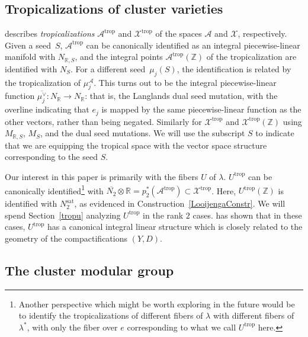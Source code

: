 \documentclass[10pt,a4paper]{amsart}
\numberwithin{equation}{section}
\numberwithin{figure}{section}
\numberwithin{table}{section}
\DeclareMathOperator{\trop}{trop}
\DeclareMathOperator{\sat}{sat}
\let\?=\overline
\let\bb=\mathbb
\let\rar=\rightarrow
\let\s=\mathcal
\theoremstyle{definition}
\begin{document}
\subsection{Tropicalizations of cluster varieties}\label{ClusterTrop}
\cite{FG1} describes {\it tropicalizations} $\s{A}^{\trop}$ and $\s{X}^{\trop}$ of the spaces $\s{A}$ and $\s{X}$, respectively. Given a seed~$S$, $\s{A}^{\trop}$ can be canonically identified as an integral piecewise-linear manifold with $N_{\bb{R},S}$, and the integral points $\s{A}^{\trop}(\bb{Z})$ of the tropicalization are identified with $N_S$. For a different seed~$\mu_j(S)$, the identification is related by the tropicalization of $\mu_j^{\s{A}}$. This turns out to be the integral piecewise-linear function $\?{\mu_j^{\vee}}\colon N_{\bb{R}}\rar N_{\bb{R}}$: that is, the Langlands dual seed mutation, with the overline indicating that $e_j$ is mapped by the same piecewise-linear function as the other vectors, rather than being negated. Similarly for $\s{X}^{\trop}$ and $\s{X}^{\trop}(\bb{Z})$ using $M_{\bb{R},S}$, $M_S$, and the dual seed mutations. We will use the subscript $S$ to indicate that we are equipping the tropical space with the vector space structure corresponding to the seed $S$.

Our interest in this paper is primarily with the fibers $U$ of $\lambda$. $U^{\trop}$ can be canonically identified\footnote{Another perspective which might be worth exploring in the future would be to identify the tropicalizations of different fibers of $\lambda$ with different fibers of $\lambda^*$, with only the fiber over $e$ corresponding to what we call $U^{\trop}$ here.} with $\?{N_2}\otimes \bb{R} = p_2^*(\s{A}^{\trop}) \subset \s{X}^{\trop}$. Here, $U^{\trop}(\bb{Z})$ is identified with $N_2^{\sat}$, as evidenced in Construction~\ref{LooijengaConstr}. We will spend Section~\ref{tropu} analyzing $U^{\trop}$ in the rank $2$ cases. \cite{GHK1} has shown that in these cases, $U^{\trop}$ has a canonical integral linear structure which is closely related to the geometry of the compactifications $(Y,D)$.

\subsection{The cluster modular group}\label{CMGdef}
\end{document}
